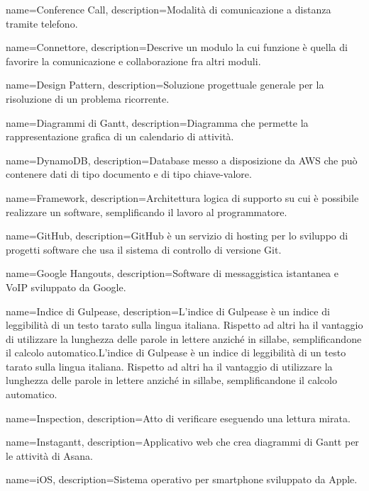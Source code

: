 {
name={Conference Call},
description={Modalità di comunicazione a distanza tramite telefono.}
}

{
name={Connettore},
description={Descrive un modulo la cui funzione è quella di favorire la comunicazione e collaborazione fra altri moduli.}
}

{
name={Design Pattern},
description={Soluzione progettuale generale per la risoluzione di un problema ricorrente.}
}

{
name={Diagrammi di Gantt},
description={Diagramma che permette la rappresentazione grafica di un calendario di attività.}
}

{
name={DynamoDB},
description={Database messo a disposizione da AWS che può contenere dati di tipo documento e di tipo chiave-valore.}
}

{
name={Framework},
description={Architettura logica di supporto su cui è possibile realizzare un software, semplificando il lavoro al programmatore.}
}

{
name={GitHub},
description={GitHub è un servizio di hosting per lo sviluppo di progetti software che usa il sistema di controllo di versione Git.}
}

{
name={Google Hangouts},
description={Software di messaggistica istantanea e VoIP sviluppato da Google.}
}

{
name={Indice di Gulpease},
description={L’indice di Gulpease è un indice di leggibilità di un testo tarato sulla lingua italiana. Rispetto ad altri ha il vantaggio di utilizzare la lunghezza delle
parole in lettere anziché in sillabe, semplificandone il calcolo automatico.L’indice di Gulpease è un indice di leggibilità di un testo tarato sulla lingua
italiana. Rispetto ad altri ha il vantaggio di utilizzare la lunghezza delle parole in lettere anziché in sillabe, semplificandone il calcolo automatico.}
}

{
name={Inspection},
description={Atto di verificare eseguendo una lettura mirata.}
}

{
name={Instagantt},
description={Applicativo web che crea diagrammi di Gantt per le attività di Asana.}
}

{
name={iOS},
description={Sistema operativo per smartphone sviluppato da Apple.}
}

